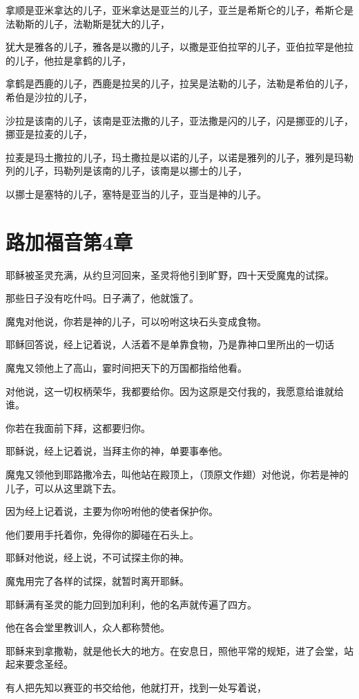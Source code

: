 \documentclass[12pt,oneside]{book}
\begin{document}
拿顺是亚米拿达的儿子，亚米拿达是亚兰的儿子，亚兰是希斯仑的儿子，希斯仑是法勒斯的儿子，法勒斯是犹大的儿子，

犹大是雅各的儿子，雅各是以撒的儿子，以撒是亚伯拉罕的儿子，亚伯拉罕是他拉的儿子，他拉是拿鹤的儿子，

拿鹤是西鹿的儿子，西鹿是拉吴的儿子，拉吴是法勒的儿子，法勒是希伯的儿子，希伯是沙拉的儿子，

沙拉是该南的儿子，该南是亚法撒的儿子，亚法撒是闪的儿子，闪是挪亚的儿子，挪亚是拉麦的儿子，

拉麦是玛土撒拉的儿子，玛土撒拉是以诺的儿子，以诺是雅列的儿子，雅列是玛勒列的儿子，玛勒列是该南的儿子，该南是以挪士的儿子，

以挪士是塞特的儿子，塞特是亚当的儿子，亚当是神的儿子。

\chapter{路加福音第4章}
耶稣被圣灵充满，从约旦河回来，圣灵将他引到旷野，四十天受魔鬼的试探。

那些日子没有吃什吗。日子满了，他就饿了。

魔鬼对他说，你若是神的儿子，可以吩咐这块石头变成食物。

耶稣回答说，经上记着说，人活着不是单靠食物，乃是靠神口里所出的一切话

魔鬼又领他上了高山，霎时间把天下的万国都指给他看。

对他说，这一切权柄荣华，我都要给你。因为这原是交付我的，我愿意给谁就给谁。

你若在我面前下拜，这都要归你。

耶稣说，经上记着说，当拜主你的神，单要事奉他。

魔鬼又领他到耶路撒冷去，叫他站在殿顶上，（顶原文作翅）对他说，你若是神的儿子，可以从这里跳下去。

因为经上记着说，主要为你吩咐他的使者保护你。

他们要用手托着你，免得你的脚碰在石头上。

耶稣对他说，经上说，不可试探主你的神。

魔鬼用完了各样的试探，就暂时离开耶稣。

耶稣满有圣灵的能力回到加利利，他的名声就传遍了四方。

他在各会堂里教训人，众人都称赞他。

耶稣来到拿撒勒，就是他长大的地方。在安息日，照他平常的规矩，进了会堂，站起来要念圣经。

有人把先知以赛亚的书交给他，他就打开，找到一处写着说，
\end{document}
